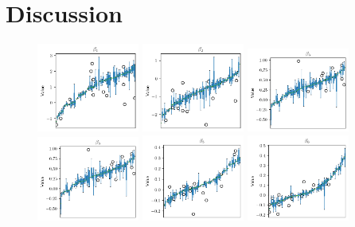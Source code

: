 \section{Discussion}

\begin{figure}[h]
	\centering
	\includegraphics[width=0.3\textwidth]{files/beta_var/beta_1_var.png}
	\includegraphics[width=0.3\textwidth]{files/beta_var/beta_2_var.png}
	\includegraphics[width=0.3\textwidth]{files/beta_var/beta_3_var.png}
	\includegraphics[width=0.3\textwidth]{files/beta_var/beta_3_var.png}
	\includegraphics[width=0.3\textwidth]{files/beta_var/beta_5_var.png}
	\includegraphics[width=0.3\textwidth]{files/beta_var/beta_6_var.png}

\end{figure}
